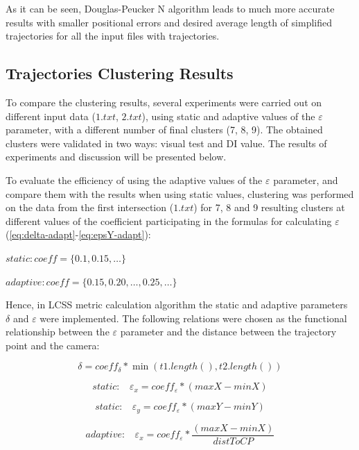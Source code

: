 As it can be seen, Douglas-Peucker N algorithm leads to much more accurate results with smaller positional errors and desired average length of simplified trajectories for all the input files with trajectories.

\subsection{Trajectories Clustering Results}

To compare the clustering results, several experiments were carried out on different input data ($1.txt$, $2.txt$), using static and adaptive values of the $\varepsilon$ parameter, with a different number of final clusters (7, 8, 9). The obtained clusters were validated in two ways: visual test and DI value. The results of experiments and discussion will be presented below.

To evaluate the efficiency of using the adaptive values of the $\varepsilon$ parameter, and compare them with the results when using static values, clustering was performed on the data from the first intersection ($1.txt$) for 7, 8 and 9 resulting clusters at different values of the coefficient participating in the formulas for calculating $\varepsilon$ (\ref{eq:delta-adapt}-\ref{eq:epsY-adapt}):

$static: coeff = \{\bm{0.1}, \bm{0.15}, \ldots\}$

$adaptive: coeff = \{0.15, \bm{0.20}, \ldots, 0.25, \ldots\}$

Hence, in LCSS metric calculation algorithm the static and adaptive parameters $\delta$ and $\varepsilon$ were implemented. The following relations were chosen as the functional relationship between the $\varepsilon$ parameter and the distance between the trajectory point and the camera:

\begin{equation} \label{eq:delta-adapt}
	\delta = coeff_\delta * \min{(t1.length(), t2.length())}
\end{equation}

\begin{equation} \label{eq:epsX-st}
	static:\ \ \ \ \varepsilon_x = coeff_\varepsilon * (maxX - minX)
\end{equation}

\begin{equation} \label{eq:epsY-st}
	static:\ \ \ \ \varepsilon_y = coeff_\varepsilon * (maxY - minY)
\end{equation}

\begin{equation} \label{eq:epsX-adapt}
	adaptive:\ \ \ \ \varepsilon_x = coeff_\varepsilon * \frac{(maxX - minX)}{distToCP}
\end{equation}


